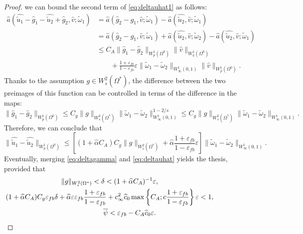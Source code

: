 \documentclass[final,hidelinks]{siamart1116Arxiv}
\numberwithin{theorem}{section}
\newcommand{\sol}{{u}}
\newcommand{\test}{{v}}
\newcommand{\allhold}{{\Omega^*}}
\newcommand{\angolo}{{\psi}}
\newcommand{\Winf}{{W^1_\infty(0,1)}}
\newcommand{\epsw}{{\varepsilon_{fb}}}
\renewcommand{\hat}[1]{\widehat{#1}}
\begin{document}
\begin{proof}
 we can bound the second term of \cref{eq:deltauhat1} as follows:
 \begin{align}
  \hat a\left(\hat{\widetilde\sol_1}-\hat g_1 - \hat{\widetilde\sol_2}+\hat g_2,\hat\test;\widetilde\omega_1\right) &= \hat a(\hat g_2-\hat g_1,\hat\test;\widetilde\omega_1) - \hat a(\hat{\widetilde\sol_2},\hat\test;\widetilde\omega_1) \\
  &=\hat a(\hat g_2-\hat g_1,\hat\test;\widetilde\omega_1) + \hat a(\hat{\widetilde\sol_2},\hat\test;\widetilde\omega_2) - \hat a(\hat{\widetilde\sol_2},\hat\test;\widetilde\omega_1) \\
  &\leq C_A\|\hat g_1-\hat g_2\|_{W^1_p(\Omega^0)}\|\hat\test\|_{W^1_q(\Omega^0)} \\
  &\qquad+ \frac{1+\epsw}{1-\epsw}\varepsilon\|\widetilde\omega_1-\widetilde\omega_2\|_{\Winf}\|\hat\test\|_{W^1_p(\Omega^0)}.
 \end{align}
 Thanks to the assumption $g\in W^2_s(\allhold)$, the difference between the two preimages of this function can be controlled in terms of the difference in the maps:
 \begin{equation}
  \|\hat g_1-\hat g_2\|_{W^1_p(\Omega^0)}\leq C_g\|g\|_{W^2_s(\allhold)}\|\widetilde\omega_1-\widetilde\omega_2\|_{\Winf}^{1-2/s} \leq C_g\|g\|_{W^2_s(\allhold)}\|\widetilde\omega_1-\widetilde\omega_2\|_{\Winf}.
 \end{equation}
 Therefore, we can conclude that
 \begin{equation}\label{eq:deltauhat}
  \|\hat{\widetilde\sol_1}-\hat{\widetilde\sol_2}\|_{W^1_p(\Omega^0)}\leq \left[(1+\hat\alpha C_A)C_g\|g\|_{W^2_s(\allhold)}+\hat\alpha\frac{1+\epsw}{1-\epsw}\varepsilon\right]\|\widetilde\omega_1-\widetilde\omega_2\|_{\Winf}.
 \end{equation}
 Eventually, merging \cref{eq:deltagamma} and \cref{eq:deltauhat} yields the thesis, provided that
 \begin{gather}
  \|g\|_{W_s^2(\allhold)} < \delta < (1+\hat\alpha C_A)^{-1}\varepsilon, \label{eq:dummy1}\phantom{\ref{eq:dummy1}}\\
  (1+\hat\alpha C_A)C_g\epsw\delta + \hat\alpha\varepsilon\epsw\frac{1+\epsw}{1-\epsw} + c_\infty^2\hat c_0\max\left\{C_A;c\frac{1+\epsw}{1-\epsw}\right\}\varepsilon < 1,\label{eq:dummy2}\phantom{\ref{eq:dummy2}}\\
  \overline\angolo < \epsw - C_A\hat c_0\varepsilon.\label{eq:psibar}
 \end{gather}

\end{proof}
\end{document}

